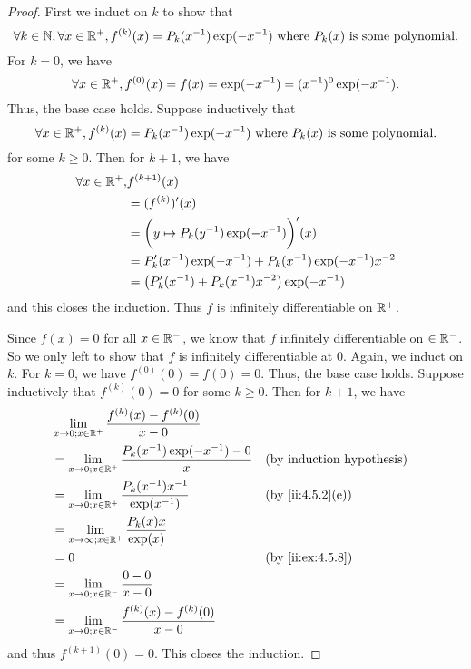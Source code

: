 \begin{proof}
  First we induct on \(k\) to show that
  \[
    \forall k \in \mathbb{N}, \forall x \in \mathbb{R}^+, f^{(k)}(x) = P_k(x^{-1}) \exp(-x^{-1}) \text{ where } P_k(x) \text{ is some polynomial}.
  \]
  For \(k = 0\), we have
  \[
    \forall x \in \mathbb{R}^+, f^{(0)}(x) = f(x) = \exp(-x^{-1}) = (x^{-1})^0 \exp(-x^{-1}).
  \]
  Thus, the base case holds.
  Suppose inductively that
  \[
    \forall x \in \mathbb{R}^+, f^{(k)}(x) = P_k(x^{-1}) \exp(-x^{-1}) \text{ where } P_k(x) \text{ is some polynomial}.
  \]
  for some \(k \geq 0\).
  Then for \(k + 1\), we have
  \begin{align*}
    \forall x \in \mathbb{R}^+, & f^{(k + 1)}(x)                                                  \\
                        & = (f^{(k)})'(x)                                                 \\
                        & = \bigg(y \mapsto P_k(y^{-1}) \exp(-x^{-1})\bigg)'(x)           \\
                        & = P_k'(x^{-1}) \exp(-x^{-1}) + P_k(x^{-1}) \exp(-x^{-1}) x^{-2} \\
                        & = \big(P_k'(x^{-1}) + P_k(x^{-1}) x^{-2}\big) \exp(-x^{-1})
  \end{align*}
  and this closes the induction.
  Thus \(f\) is infinitely differentiable on \(\mathbb{R}^+\).

  Since \(f(x) = 0\) for all \(x \in \mathbb{R}^-\), we know that \(f\) infinitely differentiable on \(\in \mathbb{R}^-\).
  So we only left to show that \(f\) is infinitely differentiable at \(0\).
  Again, we induct on \(k\).
  For \(k = 0\), we have \(f^{(0)}(0) = f(0) = 0\).
  Thus, the base case holds.
  Suppose inductively that \(f^{(k)}(0) = 0\) for some \(k \geq 0\).
  Then for \(k + 1\), we have
  \begin{align*}
     & \lim_{x \to 0 ; x \in \R^+} \dfrac{f^{(k)}(x) - f^{(k)}(0)}{x - 0}                           \\
     & = \lim_{x \to 0 ; x \in \R^+} \dfrac{P_k(x^{-1}) \exp(-x^{-1}) - 0}{x} &  & \byIH            \\
     & = \lim_{x \to 0 ; x \in \R^+} \dfrac{P_k(x^{-1}) x^{-1}}{\exp(x^{-1})} &  & \by{ii:4.5.2}[e] \\
     & = \lim_{x \to \infty ; x \in \R^+} \dfrac{P_k(x) x}{\exp(x)}                                 \\
     & = 0                                                                    &  & \by{ii:ex:4.5.8} \\
     & = \lim_{x \to 0 ; x \in \R^-} \dfrac{0 - 0}{x - 0}                                           \\
     & = \lim_{x \to 0 ; x \in \R^-} \dfrac{f^{(k)}(x) - f^{(k)}(0)}{x - 0}
  \end{align*}
  and thus \(f^{(k + 1)}(0) = 0\).
  This closes the induction.


\end{proof}
